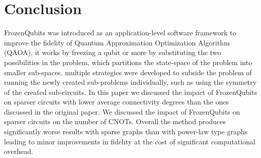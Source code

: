 \section{Conclusion}
FrozenQubits was introduced as an application-level software framework to improve the fidelity of Quantum Approximation Optimization Algorithm (QAOA), it works by freezing a qubit or more by substituting the two possibilities in the problem, which partitions the state-space of the problem into smaller sub-spaces. multiple strategies were developed to subside the problem of running the newly created sub-problems individually, such as using the symmetry of the created sub-circuits. In this paper we discussed the impact of FrozenQubits on sparser circuits with lower average connectivity degrees than the ones discussed in the original paper. We discussed the impact of FrozenQubits on sparser circuits on the number of CNOTs. Overall the method produces significantly worse results with sparse graphs than with power-law type graphs leading to minor improvements in fidelity at the cost of significant computational overhead. 





